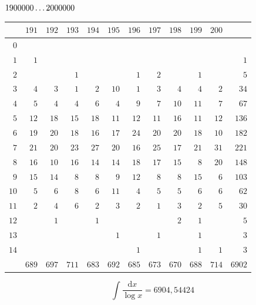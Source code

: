 \par\medskip
\noindent\begin{minipage}{\linewidth}\centering
{}
\(1900000\mathinner{.\,.\,.}2000000\)\par\smallskip
\begingroup\fontsize{10.5}{11.5}\selectfont\setlength{\tabcolsep}{3.5pt}\renewcommand{\arraystretch}{1}
\begin{tabular}{r|rrrrrrrrrr|r}\hline
 & $191$ & $192$ & $193$ & $194$ & $195$ & $196$ & $197$ & $198$ & $199$ & $200$ &  \\ \hline
$0$ &  &  &  &  &  &  &  &  &  &  &  \\
$1$ & $1$ &  &  &  &  &  &  &  &  &  & $1$ \\
$2$ &  &  & $1$ &  &  & $1$ & $2$ &  & $1$ &  & $5$ \\
$3$ & $4$ & $3$ & $1$ & $2$ & $10$ & $1$ & $3$ & $4$ & $4$ & $2$ & $34$ \\
$4$ & $5$ & $4$ & $4$ & $6$ & $4$ & $9$ & $7$ & $10$ & $11$ & $7$ & $67$ \\
$5$ & $12$ & $18$ & $15$ & $18$ & $11$ & $12$ & $11$ & $16$ & $11$ & $12$ & $136$ \\
$6$ & $19$ & $20$ & $18$ & $16$ & $17$ & $24$ & $20$ & $20$ & $18$ & $10$ & $182$ \\
$7$ & $21$ & $20$ & $23$ & $27$ & $20$ & $16$ & $25$ & $17$ & $21$ & $31$ & $221$ \\
$8$ & $16$ & $10$ & $16$ & $14$ & $14$ & $18$ & $17$ & $15$ & $8$ & $20$ & $148$ \\
$9$ & $15$ & $14$ & $8$ & $8$ & $9$ & $12$ & $8$ & $8$ & $15$ & $6$ & $103$ \\
$10$ & $5$ & $6$ & $8$ & $6$ & $11$ & $4$ & $5$ & $5$ & $6$ & $6$ & $62$ \\
$11$ & $2$ & $4$ & $6$ & $2$ & $3$ & $2$ & $1$ & $3$ & $2$ & $5$ & $30$ \\
$12$ &  & $1$ &  & $1$ &  &  &  & $2$ & $1$ &  & $5$ \\
$13$ &  &  &  &  & $1$ &  & $1$ &  & $1$ &  & $3$ \\
$14$ &  &  &  &  &  & $1$ &  &  & $1$ & $1$ & $3$ \\
\hline
 & $689$ & $697$ & $711$ & $683$ & $692$ & $685$ & $673$ & $670$ & $688$ & $714$ & $6902$ \\ \hline
\end{tabular}\par\endgroup
\setlength{\abovedisplayskip}{6pt}\setlength{\belowdisplayskip}{4pt}
\[\int\frac{\mathrm{d}x}{\log x}=6904{,}54424\]
\end{minipage}

